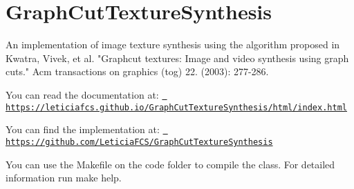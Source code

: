 \chapter{Graph\+Cut\+Texture\+Synthesis}
\hypertarget{index}{}\label{index}
\label{index_md__2home_2leticiafcs_2tcc_2GraphCutTextureSynthesis_2README}%
%
An implementation of image texture synthesis using the algorithm proposed in \textquotesingle{}Kwatra, Vivek, et al. "{}\+Graphcut textures\+: Image and video synthesis using graph cuts."{} Acm transactions on graphics (tog) 22. (2003)\+: 277-\/286.\textquotesingle{}

You can read the documentation at\+: \href{https://leticiafcs.github.io/GraphCutTextureSynthesis/html/index.html}{\texttt{ https\+://leticiafcs.\+github.\+io/\+Graph\+Cut\+Texture\+Synthesis/html/index.\+html}}

You can find the implementation at\+: \href{https://github.com/LeticiaFCS/GraphCutTextureSynthesis}{\texttt{ https\+://github.\+com/\+Leticia\+FCS/\+Graph\+Cut\+Texture\+Synthesis}}

You can use the Makefile on the code folder to compile the class. For detailed information run make help. 